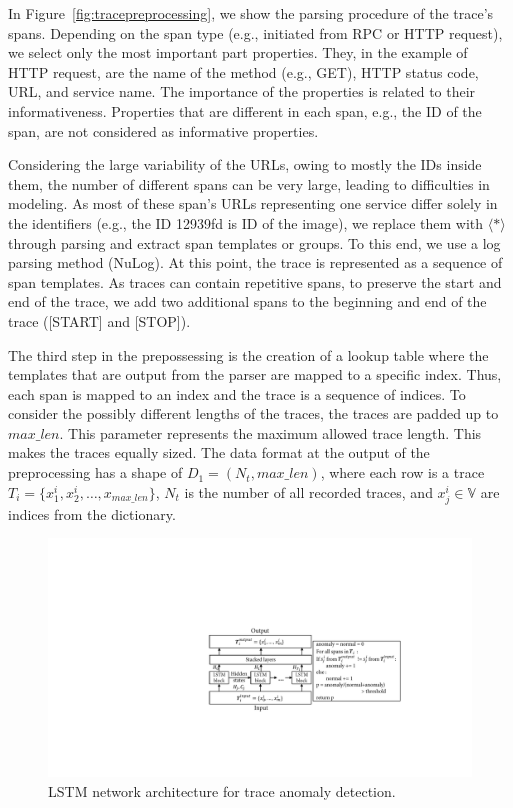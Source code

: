 In Figure~\ref{fig:tracepreprocessing}, we show the parsing procedure of the trace's spans. Depending on the span type (e.g., initiated from RPC or HTTP request), we select only the most important part properties. They, in the example of HTTP request, are the name of the method (e.g., GET), HTTP status code, URL, and service name. The importance of the properties is related to their informativeness. Properties that are different in each span, e.g., the ID of the span, are not considered as informative properties.

Considering the large variability of the URLs, owing to mostly the IDs inside them, the number of different spans can be very large, leading to difficulties in modeling. As most of these span's URLs representing one service differ solely in the identifiers (e.g., the ID 12939fd is ID of the image), we replace them with $\langle * \rangle$ through parsing and extract span templates or groups. To this end, we use a log parsing method (NuLog). At this point, the trace is represented as a sequence of span templates. As traces can contain repetitive spans, to preserve the start and end of the trace, we add two additional spans to the beginning and end of the trace ([START] and [STOP]). 

The third step in the prepossessing is the creation of a lookup table where the templates that are output from the parser are mapped to a specific index. Thus, each span is mapped to an index and the trace is a sequence of indices. To consider the possibly different lengths of the traces, the traces are padded up to $max\_len$. This parameter represents the maximum allowed trace length. This makes the traces equally sized. The data format at the output of the preprocessing has a shape of $D_1 = (N_t, max\_len)$, where each row is a trace $T_i = \{x_1^i,x_2^i,\dots, x_{max\_len}\}$, $N_t$ is the number of all recorded traces, and $x_j^i \in \mathbb{V}$ are indices from the dictionary. 

\begin{figure}[!t]
\centerline{\includegraphics[width=1.0\textwidth]{gfx/chap6/lstmprocesstrace.pdf}}
\caption{LSTM network architecture for trace anomaly detection.~\cite{nedelkoski2019anomalymultimodal}}
\label{fig:lstmtraceprocess}
\end{figure}

